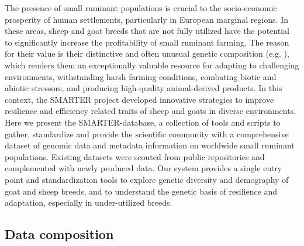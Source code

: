 \documentclass[a4paper,num-refs,gigabyte]{oup-contemporary}
\begin{document}
The presence of small ruminant populations is crucial to the socio-economic prosperity of human settlements, particularly in European marginal regions. In these areas, sheep and goat breeds that are not fully utilized have the potential to significantly increase the profitability of small ruminant farming. The reason for their value is their distinctive and often unusual genetic composition (e.g. \citep{Stella2018,Kijas2012}), which renders them an exceptionally valuable resource for adapting to challenging environments, withstanding harsh farming conditions, combating biotic and abiotic stressors, and producing high-quality animal-derived products. In this context, the SMARTER project\citep{SmarterProjectEU} developed innovative strategies to improve resilience and efficiency related traits of sheep and goats in diverse environments.
Here we present the SMARTER-database, a collection of tools and scripts to gather, standardize and provide the scientific community with a comprehensive dataset of genomic data and metadata information on worldwide small ruminant populations. Existing datasets were scouted from public repositories and complemented with newly produced data. Our system provides a single entry point and standardization tools to explore genetic diversity and demography of goat and sheep breeds, and to understand the genetic basis of resilience and adaptation, especially in under-utilized breeds.

\subsection{Data composition}
\end{document}
